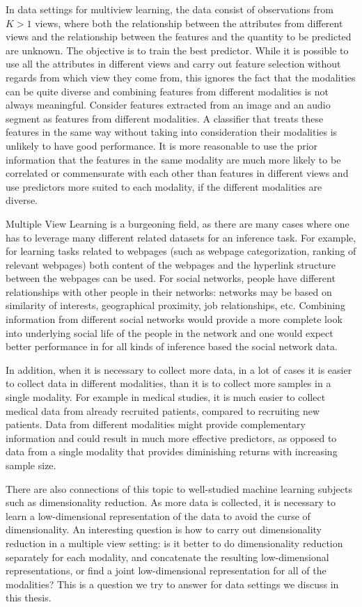 \documentclass[12pt,oneside,final]{thesis}\usepackage[]{graphicx}\usepackage[]{color}
\begin{document}
In data settings for multiview learning, the data consist of observations from $K>1$ views, where both the relationship between the attributes from different views and the relationship between the features and the quantity to be predicted are unknown. The objective is to train the best predictor. While it is possible to use all the attributes in different views and carry out feature selection without regards from which view they come from, this ignores the fact that the modalities can be quite diverse and combining features from different modalities is not always meaningful. Consider features extracted from an image  and an audio segment as features from different modalities. A classifier that treats these features in the same way without taking into consideration their modalities is  unlikely to have good performance.
It is more reasonable to use the prior information that the features in the same modality are much more likely to be correlated or commensurate with each other than features in different views and use predictors more suited to each modality, if the different modalities are diverse.

 Multiple View Learning is a burgeoning field, as there are many cases where one has to leverage many different related datasets for an inference task. For example, for learning  tasks related to webpages (such as webpage categorization, ranking of relevant webpages) both content of the webpages and the hyperlink structure between the webpages can be used. For social networks, people have different relationships with other people in their networks: networks  may be based on similarity of interests, geographical proximity, job relationships, etc. Combining information from different social networks would provide a more complete look into underlying social life of the people in the network and one would expect better performance in for all kinds of  inference based the social network data.

In addition, when it is necessary to collect more data, in a lot of cases it is easier to collect data in different modalities, than it is to collect more samples in a single modality. For example in medical studies, it is much easier to  collect medical data from already recruited patients, compared to recruiting new patients. Data from different modalities might provide complementary information and could result in much more effective predictors, as opposed to data from a single modality that provides diminishing returns with increasing sample size.

There are  also connections of this topic to well-studied machine learning subjects such as dimensionality reduction. As more data is collected, it is necessary to learn a low-dimensional representation of the data to avoid the curse of dimensionality. An interesting question is how to carry out dimensionality reduction in a multiple view setting: is it better to do dimensionality reduction separately for each modality, and concatenate the resulting low-dimensional representations, or find a joint low-dimensional representation  for all of the modalities? This is a question we try to answer for data settings we discuss in this thesis.
\end{document}
